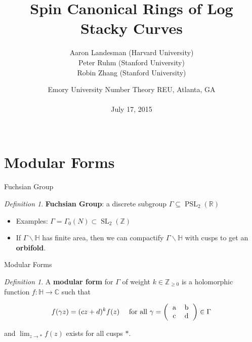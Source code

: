 \documentclass{beamer}
\title{Spin Canonical Rings of Log Stacky Curves}
\author[A. Landesman, P. Ruhm, and R. Zhang]{
Aaron Landesman (Harvard University) \\
Peter Ruhm (Stanford University) \\
Robin Zhang (Stanford University)
}
\date[July 17, 2015]{
Emory University Number Theory REU, Atlanta, GA\\
\mbox{}\\
July 17, 2015\\
\mbox{}\\
}
\theoremstyle{remark}
\newtheorem{defn}[thm]{Definition}
\newcommand\BH{{\mathbb H}}
\newcommand\BC{{\mathbb C}}
\newcommand\BR{{\mathbb R}}
\newcommand\BZ{{\mathbb Z}}
\newcommand{\SL}{\operatorname{SL}}
\newcommand{\PSL}{\operatorname{PSL}}
\begin{document}
\begin{frame}
	\titlepage
\end{frame}

\section{Modular Forms} 

\begin{frame}{Fuchsian Group}

\begin{defn}
{\bf Fuchsian Group}: a discrete subgroup $\Gamma \subseteq \PSL_2(\BR)$
\end{defn}


\begin{itemize}
\item Examples: $\Gamma = \Gamma_0(N) \subset \SL_2(\BZ)$\\
\item If $\Gamma \backslash \BH$ has finite area, then we can compactify $\Gamma \backslash \BH$ with cusps to get an {\bf orbifold}.
\end{itemize}

\end{frame}


\begin{frame}{Modular Forms}

\begin{defn}
A \textbf{modular form} for $\Gamma$ of weight $k \in \BZ_{\geq 0}$ is a holomorphic function $f \colon \BH \to \BC$ such that

\begin{align*}
	&f(\gamma z) = (cz+d)^k f(z) &\text{ for all } \gamma = \left(\begin{tabular}{c c} a & b \\ c & d \end{tabular} \right)\in \Gamma 
\end{align*}

\noindent
and $\lim_{z \to *} f(z)$ exists for all cusps $*$.
\end{defn}



\end{frame}
\end{document}
